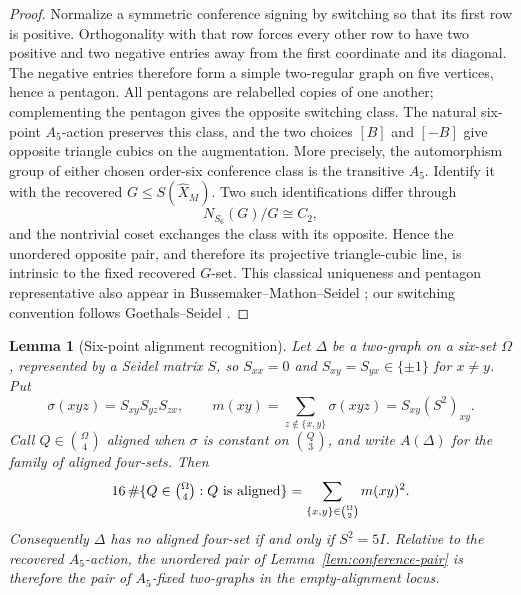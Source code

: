 \documentclass[11pt]{article}
\newtheorem{lemma}[theorem]{Lemma}
\theoremstyle{definition}
\theoremstyle{remark}
\begin{document}
\begin{proof}
Normalize a symmetric conference signing by switching so that its first row
is positive.  Orthogonality with that row forces every other row to have two
positive and two negative entries away from the first coordinate and its
diagonal.  The negative entries therefore form a simple two-regular graph on
five vertices, hence a pentagon.  All pentagons are relabelled copies of one
another; complementing the pentagon gives the opposite switching class.
The natural six-point \(A_5\)-action preserves this class, and the two
choices \([B]\) and \([-B]\) give opposite triangle cubics on the augmentation.
More precisely, the automorphism group of either chosen order-six conference class
is the transitive \(A_5\).  Identify it with the recovered
\(G\leq S(\widehat X_M)\).  Two such identifications differ through
\[
 N_{S_6}(G)/G\cong C_2,
\]
and the nontrivial coset exchanges the class with its opposite.  Hence the
unordered opposite pair, and therefore its projective triangle-cubic line,
is intrinsic to the fixed recovered \(G\)-set.  This classical uniqueness
and pentagon representative also appear in
Bussemaker--Mathon--Seidel
\cite[pp.~12, 21, and Table~9 on p.~83]{BMS1979}; our switching
convention follows Goethals--Seidel \cite[\S\S1--3]{GoethalsSeidel1967}.
\end{proof}

\begin{lemma}[Six-point alignment recognition]
\label{lem:six-point-alignment-recognition}
Let \(\Delta\) be a two-graph on a six-set \(\Omega\), represented by a
Seidel matrix \(S\), so \(S_{xx}=0\) and
\(S_{xy}=S_{yx}\in\{\pm1\}\) for \(x\ne y\).  Put
\[
 \sigma(xyz)=S_{xy}S_{yz}S_{zx},\qquad
 m(xy)=\sum_{z\notin\{x,y\}}\sigma(xyz)
      =S_{xy}(S^2)_{xy}.
\]
Call \(Q\in\binom{\Omega}{4}\) aligned when \(\sigma\) is constant on
\(\binom Q3\), and write \(A(\Delta)\) for the family of aligned four-sets.
Then
\[
 16\,\#\{Q\in\tbinom{\Omega}{4}:Q\text{ is aligned}\}
    =\sum_{\{x,y\}\in\binom{\Omega}{2}}m(xy)^2.
\]
Consequently \(\Delta\) has no aligned four-set if and only if
\(S^2=5I\).  Relative to the recovered \(A_5\)-action, the unordered pair
of Lemma~\ref{lem:conference-pair} is therefore the pair of
\(A_5\)-fixed two-graphs in the empty-alignment locus.
\end{lemma}
\end{document}
